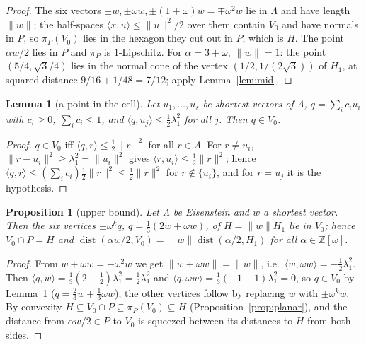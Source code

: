 \documentclass[10pt]{article}
\theoremstyle{plain}
\newtheorem{proposition}[theorem]{Proposition}
\newtheorem{lemma}[theorem]{Lemma}
\theoremstyle{remark}
\newcommand{\Z}{\mathbb{Z}}
\newcommand{\dist}{\operatorname{dist}}
\begin{document}
\begin{proof}
The six vectors $\pm w,\pm\omega w,\pm(1+\omega)w=\mp\omega^2w$ lie in
$\Lambda$ and have length $\|w\|$; the half-spaces
$\langle x,u\rangle\le\|u\|^2/2$ over them contain $V_0$ and have normals in
$P$, so $\pi_P(V_0)$ lies in the hexagon they cut out in $P$, which is $H$.
The point $\alpha w/2$ lies in $P$ and $\pi_P$ is $1$-Lipschitz. For
$\alpha=3+\omega$, $\|w\|=1$: the point $(5/4,\sqrt3/4)$ lies in the normal
cone of the vertex $(1/2,1/(2\sqrt3))$ of $H_1$, at squared distance
$9/16+1/48=7/12$; apply Lemma~\ref{lem:mid}.
\end{proof}

\begin{lemma}[a point in the cell]\label{lem:cell}
Let $u_1,\dots,u_s$ be shortest vectors of $\Lambda$, $q=\sum_ic_iu_i$ with
$c_i\ge0$, $\sum_ic_i\le1$, and $\langle q,u_j\rangle\le\frac12\lambda_1^2$
for all $j$. Then $q\in V_0$.
\end{lemma}

\begin{proof}
$q\in V_0$ iff $\langle q,r\rangle\le\frac12\|r\|^2$ for all $r\in\Lambda$.
For $r\ne u_i$, $\|r-u_i\|^2\ge\lambda_1^2=\|u_i\|^2$ gives
$\langle r,u_i\rangle\le\frac12\|r\|^2$; hence
$\langle q,r\rangle\le(\sum_ic_i)\frac12\|r\|^2\le\frac12\|r\|^2$ for
$r\notin\{u_i\}$, and for $r=u_j$ it is the hypothesis.
\end{proof}

\begin{proposition}[upper bound]\label{prop:eisup}
Let $\Lambda$ be Eisenstein and $w$ a shortest vector. Then the six vertices
$\pm\omega^kq$, $q=\frac13(2w+\omega w)$, of $H=\|w\|H_1$ lie in $V_0$; hence
$V_0\cap P=H$ and $\dist(\alpha w/2,V_0)=\|w\|\dist(\alpha/2,H_1)$ for all
$\alpha\in\Z[\omega]$.
\end{proposition}

\begin{proof}
From $w+\omega w=-\omega^2w$ we get $\|w+\omega w\|=\|w\|$, i.e.\
$\langle w,\omega w\rangle=-\frac12\lambda_1^2$. Then
$\langle q,w\rangle=\frac13(2-\frac12)\lambda_1^2=\frac12\lambda_1^2$ and
$\langle q,\omega w\rangle=\frac13(-1+1)\lambda_1^2=0$, so $q\in V_0$ by
Lemma~\ref{lem:cell} ($q=\frac23w+\frac13\omega w$); the other vertices
follow by replacing $w$ with $\pm\omega^kw$. By convexity
$H\subseteq V_0\cap P\subseteq\pi_P(V_0)\subseteq H$
(Proposition~\ref{prop:planar}), and the distance from $\alpha w/2\in P$ to
$V_0$ is squeezed between its distances to $H$ from both sides.
\end{proof}
\end{document}
